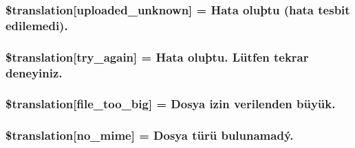 \subsubsection[{\$translation}]{\setlength{\rightskip}{0pt plus 5cm}\$translation\mbox{[}\textquotesingle{}uploaded\+\_\+unknown\textquotesingle{}\mbox{]} = \textquotesingle{}Hata oluþtu (hata tesbit edilemedi).\textquotesingle{}}\label{class_8upload_8tr___t_r_8php_a4a9168e922b827e6a28b5db1c00774ca}
\hypertarget{class_8upload_8tr___t_r_8php_a3afc377bd803683314f413a814243066}{}
\subsubsection[{\$translation}]{\setlength{\rightskip}{0pt plus 5cm}\$translation\mbox{[}\textquotesingle{}try\+\_\+again\textquotesingle{}\mbox{]} = \textquotesingle{}Hata oluþtu. Lütfen tekrar deneyiniz.\textquotesingle{}}\label{class_8upload_8tr___t_r_8php_a3afc377bd803683314f413a814243066}
\hypertarget{class_8upload_8tr___t_r_8php_a476278eb4a0c3df56af068e2d511a741}{}
\subsubsection[{\$translation}]{\setlength{\rightskip}{0pt plus 5cm}\$translation\mbox{[}\textquotesingle{}file\+\_\+too\+\_\+big\textquotesingle{}\mbox{]} = \textquotesingle{}Dosya izin verilenden büyük.\textquotesingle{}}\label{class_8upload_8tr___t_r_8php_a476278eb4a0c3df56af068e2d511a741}
\hypertarget{class_8upload_8tr___t_r_8php_a191a55df8e3bb7f3c51b70f3c1932e02}{}
\subsubsection[{\$translation}]{\setlength{\rightskip}{0pt plus 5cm}\$translation\mbox{[}\textquotesingle{}no\+\_\+mime\textquotesingle{}\mbox{]} = \textquotesingle{}Dosya türü bulunamadý.\textquotesingle{}}\label{class_8upload_8tr___t_r_8php_a191a55df8e3bb7f3c51b70f3c1932e02}
\hypertarget{class_8upload_8tr___t_r_8php_a4d32343e2699edd6fd435f9c832cb9c7}{}
